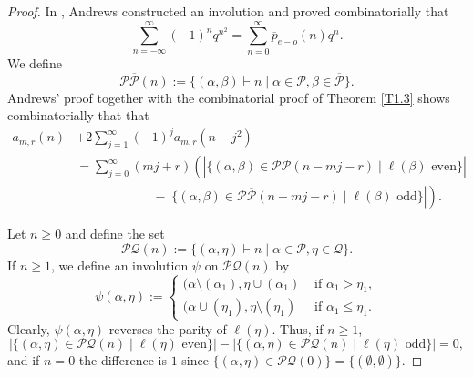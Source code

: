 \documentclass{amsart}
\theoremstyle{definition}
\begin{document}
\begin{proof} In \cite{A72},  Andrews constructed an involution and proved  combinatorially that \begin{equation}\label{A1} \sum_{n=-\infty}^\infty (-1)^nq^{n^2}=\sum_{n=0}^\infty \overline p_{e-o}(n)q^n.\end{equation} We define
$$\mathcal P \overline{\mathcal P}(n):= \{(\alpha, \beta)\vdash n \mid \alpha \in \mathcal P, \beta\in \overline{\mathcal P}\}.$$ Andrews' proof together with the combinatorial proof of   Theorem \ref{T1.3} shows combinatorially that  that 
\begin{align*}a_{m,r}(n)&+2\sum_{j=1}^\infty (-1)^j a_{m,r}(n-j^2)\\ & =\sum_{j=0}^\infty (mj+r)\left(|\{(\alpha, \beta)\in  \mathcal P \overline{\mathcal P}(n-mj-r) \mid \ell(\beta) \text{ even}\}|\right.\\  &\qquad \qquad\qquad-\left. |\{(\alpha, \beta)\in  \mathcal P \overline{\mathcal P}(n-mj-r) \mid \ell(\beta) \text{ odd}\}|\right).\end{align*}


Let $n\geq 0$ and define the set $$\mathcal{PQ}(n):=\{(\alpha, \eta)\vdash n \mid \alpha \in \mathcal P, \eta \in \mathcal Q\}.$$  If $n\geq 1$, we define an involution $\psi$ on $\mathcal{PQ}(n)$ by  $$\psi(\alpha, \eta):=\begin{cases}(\alpha\setminus (\alpha_1), \eta\cup (\alpha_1) & \text{ if } \alpha_1>\eta_1, \\ (\alpha\cup (\eta_1), \eta\setminus  (\eta_1) & \text{ if } \alpha_1\leq\eta_1.\end{cases}$$ Clearly, $\psi(\alpha, \eta)$ reverses the parity of $\ell(\eta)$. Thus, if $n\geq 1$,  $$|\{(\alpha, \eta) \in \mathcal{PQ}(n)\mid  \ell(\eta) \text{ even}\}|-|\{(\alpha, \eta) \in \mathcal{PQ}(n)\mid  \ell(\eta) \text{ odd}\}|=0,$$ and if $n=0$ the difference is $1$ since $\{(\alpha, \eta) \in \mathcal{PQ}(0)\}= \{(\emptyset, \emptyset)\}.$


\end{proof}
\end{document}
